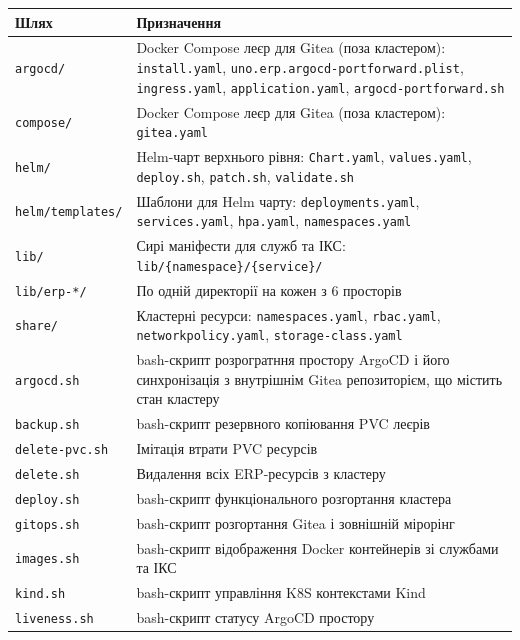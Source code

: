 \documentclass[12pt,a4paper]{article}
\begin{document}
\begin{longtable}{L{3cm} L{12cm}}
\toprule
{}
\color{primary}\textbf{Шлях} & \color{primary}\textbf{Призначення} \\
\midrule\endhead\bottomrule\endfoot
{}\texttt{argocd/} & Docker Compose леєр для Gitea (поза кластером): \texttt{install.yaml}, \texttt{uno.erp.argocd-portforward.plist}, \texttt{ingress.yaml}, \texttt{application.yaml}, \texttt{argocd-portforward.sh} \\[2pt]
\texttt{compose/} & Docker Compose леєр для Gitea (поза кластером): \texttt{gitea.yaml} \\[2pt]
\texttt{helm/} & Helm-чарт верхнього рівня: \texttt{Chart.yaml}, \texttt{values.yaml}, \texttt{deploy.sh},  \texttt{patch.sh}, \texttt{validate.sh} \\[2pt]
\texttt{helm/templates/} & Шаблони для Helm чарту: \texttt{deployments.yaml}, \texttt{services.yaml}, \texttt{hpa.yaml}, \texttt{namespaces.yaml} \\[2pt]
\texttt{lib/} & Сирі маніфести для служб та ІКС: \texttt{lib/\{namespace\}/\{service\}/} \\[2pt]
\texttt{lib/erp-*/} & По одній директорії на кожен з 6 просторів \\[2pt]
\texttt{share/} & Кластерні ресурси: \texttt{namespaces.yaml}, \texttt{rbac.yaml}, \texttt{networkpolicy.yaml}, \texttt{storage-class.yaml} \\[2pt]
\texttt{argocd.sh} & bash-скрипт розрогратння простору ArgoCD і його синхронізація з внутрішнім Gitea репозиторієм, що містить стан кластеру\\[2pt]
\texttt{backup.sh} & bash-скрипт резервного копіювання PVC леєрів\\[2pt]
\texttt{delete-pvc.sh} & Імітація втрати PVC ресурсів \\[2pt]
\texttt{delete.sh} & Видалення всіх ERP-ресурсів з кластеру \\[2pt]
\texttt{deploy.sh} & bash-скрипт функціонального розгортання кластера \\[2pt]
\texttt{gitops.sh} & bash-скрипт розгортання Gitea і зовнішній мірорінг\\[2pt]
\texttt{images.sh} & bash-скрипт відображення Docker контейнерів зі службами та ІКС\\[2pt]
\texttt{kind.sh} & bash-скрипт управління K8S контекстами Kind\\[2pt]
\texttt{liveness.sh} & bash-скрипт статусу ArgoCD простору\\[2pt]

\end{longtable}
\end{document}
